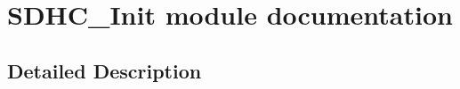 \hypertarget{group___s_d_h_c___init__module}{}\section{S\+D\+H\+C\+\_\+\+Init module documentation}
\label{group___s_d_h_c___init__module}


\subsection{Detailed Description}
